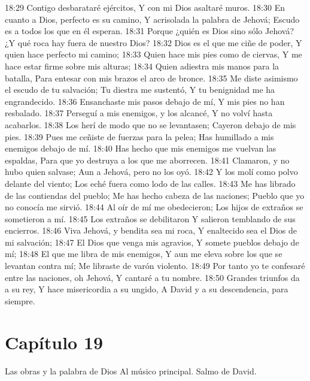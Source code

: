 18:29 Contigo desbarataré ejércitos, 
Y con mi Dios asaltaré muros. 
18:30 En cuanto a Dios, perfecto es su camino, 
Y acrisolada la palabra de Jehová; 
Escudo es a todos los que en él esperan. 
18:31 Porque ¿quién es Dios sino sólo Jehová? 
¿Y qué roca hay fuera de nuestro Dios? 
18:32 Dios es el que me ciñe de poder, 
Y quien hace perfecto mi camino; 
18:33 Quien hace mis pies como de ciervas, 
Y me hace estar firme sobre mis alturas; 
18:34 Quien adiestra mis manos para la batalla, 
Para entesar con mis brazos el arco de bronce. 
18:35 Me diste asimismo el escudo de tu salvación; 
Tu diestra me sustentó, 
Y tu benignidad me ha engrandecido. 
18:36 Ensanchaste mis pasos debajo de mí, 
Y mis pies no han resbalado. 
18:37 Perseguí a mis enemigos, y los alcancé, 
Y no volví hasta acabarlos. 
18:38 Los herí de modo que no se levantasen; 
Cayeron debajo de mis pies. 
18:39 Pues me ceñiste de fuerzas para la pelea; 
Has humillado a mis enemigos debajo de mí. 
18:40 Has hecho que mis enemigos me vuelvan las espaldas, 
Para que yo destruya a los que me aborrecen. 
18:41 Clamaron, y no hubo quien salvase; 
Aun a Jehová, pero no los oyó. 
18:42 Y los molí como polvo delante del viento; 
Los eché fuera como lodo de las calles. 
18:43 Me has librado de las contiendas del pueblo; 
Me has hecho cabeza de las naciones; 
Pueblo que yo no conocía me sirvió. 
18:44 Al oír de mí me obedecieron; 
Los hijos de extraños se sometieron a mí. 
18:45 Los extraños se debilitaron 
Y salieron temblando de sus encierros. 
18:46 Viva Jehová, y bendita sea mi roca, 
Y enaltecido sea el Dios de mi salvación; 
18:47 El Dios que venga mis agravios, 
Y somete pueblos debajo de mí; 
18:48 El que me libra de mis enemigos, 
Y aun me eleva sobre los que se levantan contra mí; 
Me libraste de varón violento. 
18:49 Por tanto yo te confesaré entre las naciones, oh Jehová, 
Y cantaré a tu nombre. 
18:50 Grandes triunfos da a su rey, 
Y hace misericordia a su ungido, 
A David y a su descendencia, para siempre. 
\section*{Capítulo 19}
Las obras y la palabra de Dios 
Al músico principal. Salmo de David. 

